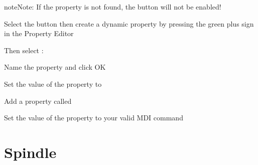 \documentclass[letterpaper,10pt,english]{sphinxmanual}
\begin{document}
\begin{sphinxadmonition}{note}{Note:}
\sphinxAtStartPar
If the  property is not found, the button will not be
enabled!
\end{sphinxadmonition}

\sphinxAtStartPar
Select the button then create a dynamic property by pressing the green plus
sign in the Property Editor


\sphinxAtStartPar
Then select :


\sphinxAtStartPar
Name the property  and click OK


\sphinxAtStartPar
Set the value of the property to 


\sphinxAtStartPar
Add a property called 


\sphinxAtStartPar
Set the value of the property to your valid MDI command


\sphinxstepscope


\chapter{Spindle}
\label{\detokenize{spindle:spindle}}\label{\detokenize{spindle::doc}}
\sphinxAtStartPar
{}
\end{document}

